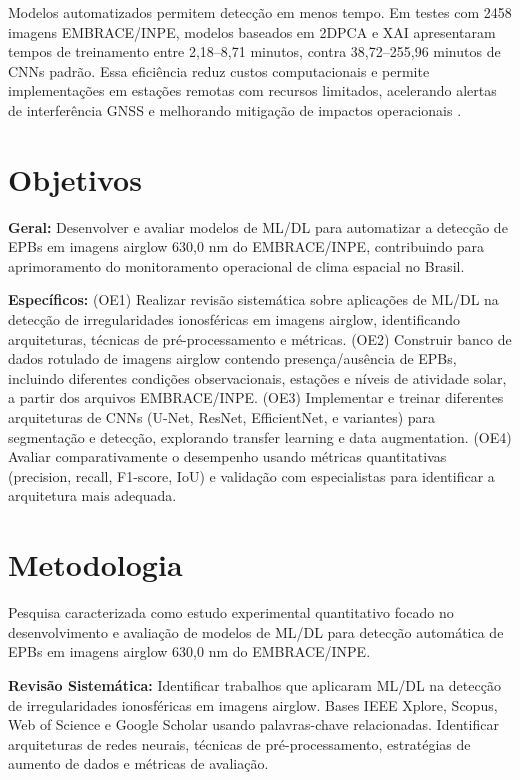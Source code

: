 \documentclass[twocolumn]{article}
\begin{document}
Modelos automatizados permitem detecção em menos tempo. Em testes com 2458 imagens EMBRACE/INPE, modelos baseados em 2DPCA e XAI apresentaram tempos de treinamento entre 2,18–8,71 minutos, contra 38,72–255,96 minutos de CNNs padrão. Essa eficiência reduz custos computacionais e permite implementações em estações remotas com recursos limitados, acelerando alertas de interferência GNSS e melhorando mitigação de impactos operacionais \cite{Yacoub2025}.

\section{Objetivos}

\textbf{Geral:} Desenvolver e avaliar modelos de ML/DL para automatizar a detecção de EPBs em imagens airglow 630,0 nm do EMBRACE/INPE, contribuindo para aprimoramento do monitoramento operacional de clima espacial no Brasil.

\textbf{Específicos:} (OE1) Realizar revisão sistemática sobre aplicações de ML/DL na detecção de irregularidades ionosféricas em imagens airglow, identificando arquiteturas, técnicas de pré-processamento e métricas. (OE2) Construir banco de dados rotulado de imagens airglow contendo presença/ausência de EPBs, incluindo diferentes condições observacionais, estações e níveis de atividade solar, a partir dos arquivos EMBRACE/INPE. (OE3) Implementar e treinar diferentes arquiteturas de CNNs (U-Net, ResNet, EfficientNet, e variantes) para segmentação e detecção, explorando transfer learning e data augmentation. (OE4) Avaliar comparativamente o desempenho usando métricas quantitativas (precision, recall, F1-score, IoU) e validação com especialistas para identificar a arquitetura mais adequada.

\section{Metodologia}

Pesquisa caracterizada como estudo experimental quantitativo focado no desenvolvimento e avaliação de modelos de ML/DL para detecção automática de EPBs em imagens airglow 630,0 nm do EMBRACE/INPE.

\textbf{Revisão Sistemática:} Identificar trabalhos que aplicaram ML/DL na detecção de irregularidades ionosféricas em imagens airglow. Bases IEEE Xplore, Scopus, Web of Science e Google Scholar usando palavras-chave relacionadas. Identificar arquiteturas de redes neurais, técnicas de pré-processamento, estratégias de aumento de dados e métricas de avaliação.
\end{document}
